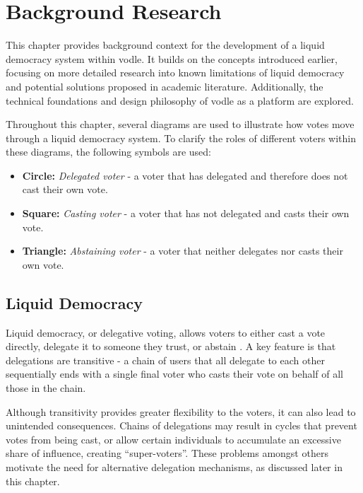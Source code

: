 \chapter{Background Research}\label{ch:background}

This chapter provides background context for the development of a liquid democracy system within vodle. It builds on the concepts introduced earlier, focusing on more detailed research into known limitations of liquid democracy and potential solutions proposed in academic literature. Additionally, the technical foundations and design philosophy of vodle as a platform are explored.

Throughout this chapter, several diagrams are used to illustrate how votes move through a liquid democracy system. To clarify the roles of different voters within these diagrams, the following symbols are used:
\begin{itemize}
  \item \textbf{Circle: } \textit{Delegated voter} - a voter that has delegated and therefore does not cast their own vote.
  \item \textbf{Square: } \textit{Casting voter} - a voter that has not delegated and casts their own vote.
  \item \textbf{Triangle: } \textit{Abstaining voter} - a voter that neither delegates nor casts their own vote.
\end{itemize}

\section{Liquid Democracy}

Liquid democracy, or delegative voting, allows voters to either cast a vote directly, delegate it to someone they trust, or abstain \citep{blum_liquid_2016}. A key feature is that delegations are transitive - a chain of users that all delegate to each other sequentially ends with a single final voter who casts their vote on behalf of all those in the chain.

Although transitivity provides greater flexibility to the voters, 
it can also lead to unintended consequences. Chains of delegations may result in cycles that prevent votes from being cast, or allow certain individuals to accumulate an excessive share of influence, creating ``super-voters''. These problems amongst others motivate the need for alternative delegation mechanisms, as discussed later in this chapter.

